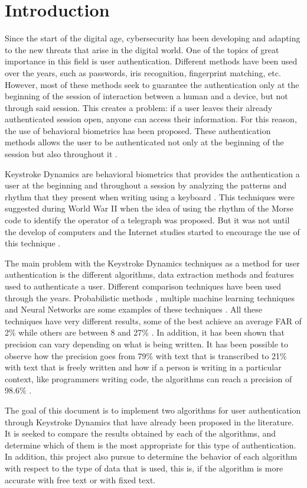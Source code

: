 \section{Introduction}

Since the start of the digital age, cybersecurity has been developing and adapting to the new threats that arise in the digital world. One of the topics of great importance in this field is user authentication. Different methods have been used over the years, such as passwords, iris recognition, fingerprint matching, etc. However, most of these methods seek to guarantee the authentication only at the beginning of the session of interaction between a human and a device, but not through said session. This creates a problem: if a user leaves their already authenticated session open, anyone can access their information. For this reason, the use of behavioral biometrics has been proposed. These authentication methods allows the user to be authenticated not only at the beginning of the session but also throughout it \cite{behavior}.

Keystroke Dynamics are behavioral biometrics that provides the authentication a user at the beginning and throughout a session by analyzing the patterns and rhythm that they present when writing using a keyboard \cite{combine_distance}. This techniques were suggested during World War II \cite{secondworldwar} when the idea of using the rhythm of the Morse code to identify the operator of a telegraph was proposed. But it was not until the develop of computers and the Internet studies started to encourage the use of this technique \cite{monrose2000keystroke}.


The main problem with the Keystroke Dynamics techniques as a method for user authentication is the different algorithms, data extraction methods and features used to authenticate a user. Different comparison techniques have been used through the years. Probabilistic methods \cite{bleha1990login}, multiple machine learning techniques \cite{machine_learning} and Neural Networks are some examples of these techniques \cite{pnn, deep_learning}. All these techniques have very different results, some of the best achieve an average FAR of 2\% while others are between 8 and 27\% \cite{typing_patterns}. In addition, it has been shown that precision can vary depending on what is being written. It has been possible to observe how the precision goes from 79\% with text that is transcribed to 21\% with text that is freely written \cite{old} and how if a person is writing in a particular context, like programmers writing code, the algorithms can reach a precision of 98.6\% \cite{programmers}.

The goal of this document is to implement two algorithms for user authentication through Keystroke Dynamics that have already been proposed in the literature. It is seeked to compare the results obtained by each of the algorithms, and determine which of them is the most appropriate for this type of authentication. In addition, this project also pursue to determine the behavior of each algorithm with respect to the type of data that is used, this is, if the algorithm is more accurate with free text or with fixed text.